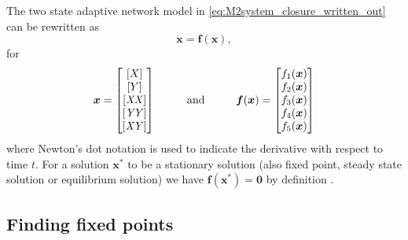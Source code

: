The two state adaptive network model in \cref{eq:M2system_closure_written_out} can be rewritten as 
\begin{equation}
\bm{\dot{x}} = \bm{f}(\bm{x}),
\end{equation}
for
\begin{equation*}
\bm{x} =
\begin{bmatrix}
\X\\
\Y\\
\XX\\
\YY\\
\XY
\end{bmatrix} 
\hspace{10mm}
\text{and}
\hspace{10mm}
\bm{f}(\bm{x}) = 
\begin{bmatrix}
f_1(\bm{x})\\
f_2(\bm{x})\\
f_3(\bm{x})\\
f_4(\bm{x})\\
f_5(\bm{x})
\end{bmatrix} 
\end{equation*}
where Newton's dot notation is used to indicate the derivative with respect to time $t$. For a solution $\bm{x}^*$ to be a stationary solution (also fixed point, steady state solution or equilibrium solution) we have $\bm{f}(\bm{x}^*)=\bm{0}$ by definition \cite{Strogatz1994}.


\subsection{Finding fixed points}

